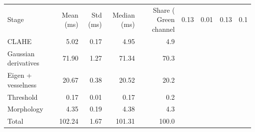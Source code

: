 \begin{tabular}{lrrrr}
\toprule
Stage & Mean (ms) & Std (ms) & Median (ms) & Share (%
\midrule
Green channel & 0.13 & 0.01 & 0.13 & 0.1 \\
CLAHE & 5.02 & 0.17 & 4.95 & 4.9 \\
Gaussian derivatives & 71.90 & 1.27 & 71.34 & 70.3 \\
Eigen + vesselness & 20.67 & 0.38 & 20.52 & 20.2 \\
Threshold & 0.17 & 0.01 & 0.17 & 0.2 \\
Morphology & 4.35 & 0.19 & 4.38 & 4.3 \\
Total & 102.24 & 1.67 & 101.31 & 100.0 \\
\bottomrule
\end{tabular}
